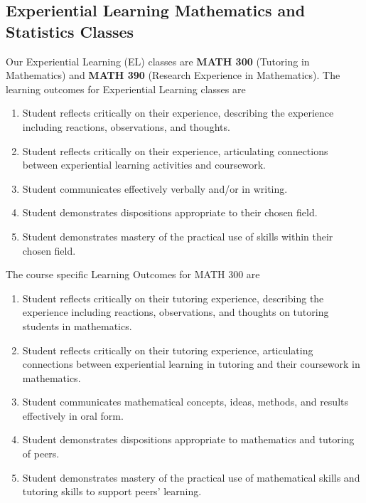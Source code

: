 \documentclass[11pt]{article}
\newenvironment{alphalist}{
\begin{enumerate}[label=(\arabic*),widest=107 ,leftmargin=25pt, itemsep=0pt]}
{\end{enumerate}}
\begin{document}
\subsection{Experiential Learning Mathematics and Statistics Classes}


Our Experiential Learning (EL) classes are \textbf{MATH 300} 
(Tutoring in Mathematics) and \textbf{MATH 390} (Research Experience in Mathematics).
The learning outcomes for Experiential Learning classes are

\begin{alphalist}
    \item Student reflects critically on their experience, describing the experience including reactions, observations, and thoughts.

\item Student reflects critically on their experience, articulating connections between experiential learning activities and coursework.

\item Student communicates effectively verbally and/or in writing.

\item Student demonstrates dispositions appropriate to their chosen field.

\item Student demonstrates mastery of the practical use of skills within their chosen field.
\end{alphalist}
The course specific Learning Outcomes for MATH 300 are
\begin{alphalist}
\item Student reflects critically on their tutoring experience, describing the experience including reactions, observations, and thoughts on tutoring students in mathematics.

\item Student reflects critically on their tutoring experience, articulating connections between experiential learning in tutoring and their coursework in mathematics.

\item  Student communicates mathematical concepts, ideas, methods, and results effectively in oral form.

\item Student demonstrates dispositions appropriate to mathematics and tutoring of peers.

\item  Student demonstrates mastery of the practical use of mathematical skills and tutoring skills to support peers' learning.

\end{alphalist}
\end{document}
